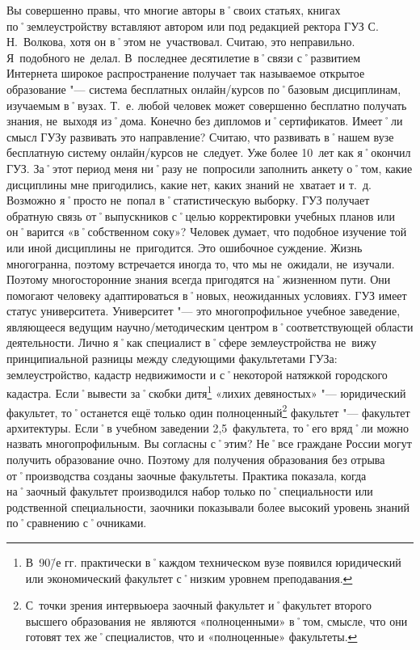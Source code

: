 \begin{drama}
	\michaelspeaks Вы совершенно правы, что многие авторы в˚своих статьях, книгах по˚землеустройству вставляют автором или под редакцией ректора ГУЗ С.\,Н.~Волкова, хотя он в˚этом не~участвовал. Считаю, это неправильно. Я~подобного не~делал. 
	\maxspeaks В~последнее десятилетие в˚связи с˚развитием Интернета широкое распространение получает так называемое открытое образование "--- система бесплатных онлайн\-/курсов по˚базовым дисциплинам, изучаемым в˚вузах. Т.~е. любой человек может совершенно бесплатно получать знания, не~выходя из˚дома. Конечно без дипломов и˚сертификатов. Имеет˚ли смысл ГУЗу развивать это направление?
	\michaelspeaks Считаю, что развивать в˚нашем вузе бесплатную систему онлайн\-/курсов не~следует.
	\maxspeaks Уже более 10~лет как я˚окончил ГУЗ. За˚этот период меня ни˚разу не~попросили заполнить анкету о˚том, какие дисциплины мне пригодились, какие нет, каких знаний не~хватает и т.~д. Возможно я˚просто не~попал в˚статистическую выборку. ГУЗ получает обратную связь от˚выпускников с˚целью корректировки учебных планов или он˚варится  «в˚собственном соку»?
	\michaelspeaks Человек думает, что подобное изучение той или иной дисциплины не~пригодится. Это ошибочное суждение. Жизнь многогранна, поэтому встречается иногда то, что мы не~ожидали, не~изучали. Поэтому многосторонние знания всегда пригодятся на˚жизненном пути. Они помогают человеку адаптироваться в˚новых, неожиданных условиях.
	\maxspeaks ГУЗ имеет статус университета. Университет "--- это многопрофильное учебное заведение, являющееся ведущим научно\-/методическим центром в˚соответствующей области деятельности. 
Лично я˚как специалист в˚сфере землеустройства не~вижу принципиальной разницы между следующими факультетами ГУЗа: землеустройство, кадастр недвижимости и с˚некоторой натяжкой городского кадастра. Если˚вывести за˚скобки дитя\footnote{В~90\=/е гг. практически в˚каждом техническом вузе появился юридический или экономический факультет с˚низким уровнем преподавания.}  «лихих девяностых» "--- юридический факультет, то˚останется ещё только один полноценный\footnote{С~точки зрения интервьюера заочный факультет и˚факультет второго высшего образования не~являются  «полноценными» в˚том, смысле, что они готовят тех же˚специалистов, что и  «полноценные» факультеты.} факультет "--- факультет архитектуры. Если˚в учебном заведении 2,5~факультета, то˚его вряд˚ли можно назвать многопрофильным. Вы согласны с˚этим?
	\michaelspeaks Не˚все граждане России могут получить образование очно. Поэтому для получения образования без отрыва от˚производства созданы заочные факультеты. Практика показала, когда на˚заочный факультет производился набор только по˚специальности или родственной специальности, заочники показывали более высокий уровень знаний по˚сравнению с˚очниками.

\end{drama}
